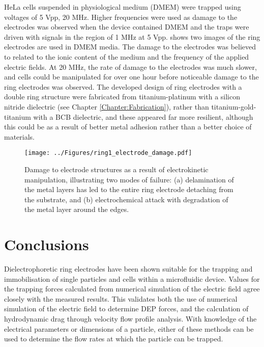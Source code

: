 HeLa cells suspended in physiological medium (DMEM) were trapped using voltages of 5 Vpp, 20 MHz. Higher frequencies were used as damage to the electrodes was observed when the device contained DMEM and the traps were driven with signals in the region of 1 MHz at 5 Vpp.  shows two images of the ring electrodes are used in DMEM media. The damage to the electrodes was believed to related to the ionic content of the medium and the frequency of the applied electric fields. At 20 MHz, the rate of damage to the electrodes was much slower, and cells could be manipulated for over one hour before noticeable damage to the ring electrodes was observed. The developed design of ring electrodes with a double ring structure were fabricated from titanium-platinum with a silicon nitride dielectric (see Chapter \ref{Chapter:Fabrication}), rather than titanium-gold-titanium with a BCB dielectric, and these appeared far more resilient, although this could be as a result of better metal adhesion rather than a better choice of materials. 

\begin{figure}
	\centering
		\texttt{[image: ../Figures/ring1\_electrode\_damage.pdf]}
	\caption[Damage to electrode structures as a result of electrokinetic manipulation.]{Damage to electrode structures as a result of electrokinetic manipulation, illustrating two modes of failure: (a) delamination of the metal layers has led to the entire ring electrode detaching from the substrate, and (b) electrochemical attack with degradation of the metal layer around the edges.}
	\label{fig:ring1_electrode_damage}
	\end{figure}

\section{Conclusions}

Dielectrophoretic ring electrodes have been shown suitable for the trapping and immobilisation of single particles and cells within a microfluidic device. Values for the trapping forces calculated from numerical simulation of the electric field agree closely with the measured results. This validates both the use of numerical simulation of the electric field to determine DEP forces, and the calculation of hydrodynamic drag through velocity flow profile analysis. With knowledge of the electrical parameters or dimensions of a particle, either of these methods can be used to determine the flow rates at which the particle can be trapped.

